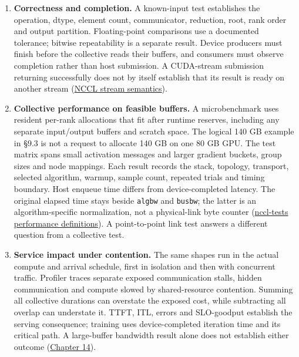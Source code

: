 \begin{enumerate}
\def\labelenumi{\arabic{enumi}.}
\item
  \textbf{Correctness and completion.} A known-input test establishes
  the operation, dtype, element count, communicator, reduction, root,
  rank order and output partition. Floating-point comparisons use a
  documented tolerance; bitwise repeatability is a separate result.
  Device producers must finish before the collective reads their
  buffers, and consumers must observe completion rather than host
  submission. A CUDA-stream submission returning successfully does not
  by itself establish that its result is ready on another stream
  (\href{https://docs.nvidia.com/deeplearning/nccl/user-guide/docs/usage/streams.html}{NCCL
  stream semantics}).
\item
  \textbf{Collective performance on feasible buffers.} A microbenchmark
  uses resident per-rank allocations that fit after runtime reserves,
  including any separate input/output buffers and scratch space. The
  logical 140 GB example in §9.3 is not a request to allocate 140 GB on
  one 80 GB GPU. The test matrix spans small activation messages and
  larger gradient buckets, group sizes and node mappings. Each result
  records the stack, topology, transport, selected algorithm, warmup,
  sample count, repeated trials and timing boundary. Host enqueue time
  differs from device-completed latency. The original elapsed time stays
  beside \texttt{algbw} and \texttt{busbw}; the latter is an
  algorithm-specific normalization, not a physical-link byte counter
  (\href{https://github.com/NVIDIA/nccl-tests/blob/afd59abab774a6a4b492eb344bd0c845a0b7bb4d/doc/PERFORMANCE.md}{nccl-tests
  performance definitions}). A point-to-point link test answers a
  different question from a collective test.
\item
  \textbf{Service impact under contention.} The same shapes run in the
  actual compute and arrival schedule, first in isolation and then with
  concurrent traffic. Profiler traces separate exposed communication
  stalls, hidden communication and compute slowed by shared-resource
  contention. Summing all collective durations can overstate the exposed
  cost, while subtracting all overlap can understate it. TTFT, ITL,
  errors and SLO-goodput establish the serving consequence; training
  uses device-completed iteration time and its critical path. A
  large-buffer bandwidth result alone does not establish either outcome
  (\hyperref[chap:14]{Chapter 14}).
\end{enumerate}

